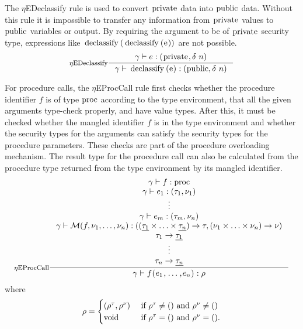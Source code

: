 \documentclass[a4paper, 10pt, draft]{report}
\newcommand{\mycode}[1]{\ensuremath{\mbox{\lstinline{#1}}}}
\begin{document}
The $\eta$EDeclassify rule is used to convert \mycode{private} data into
\mycode{public} data. Without this rule it is impossible to transfer any
information from \mycode{private} values to \mycode{public} variables or
output. By requiring the argument to be of \mycode{private} security type,
expressions like \mycode{declassify(declassify(e))} are not possible.
\[
\inference[$\eta$EDeclassify]{\gamma |- e : (\mycode{private}, \delta\ n)}{\gamma |- \mycode{declassify(e)} : (\mycode{public}, \delta\ n)}
\]

For procedure calls, the $\eta$EProcCall rule first checks whether the
procedure identifier $f$ is of type \mycode{proc} according to the type
environment, that all the given arguments type-check properly, and have value
types. After this, it must be checked whether the mangled identifier $f$ is in
the type environment and whether the security types for the arguments can
satisfy the security types for the procedure parameters. These checks are part
of the procedure overloading mechanism. The result type for the procedure call
can also be calculated from the procedure type returned from the type
environment by its mangled identifier.
\[ \inference[$\eta$EProcCall]{
  \gamma |- f : \mycode{proc}\\
  \gamma |- e_1 : (\tau_1, \nu_1) \\
  \vdots \\
  \gamma |- e_m : (\tau_m, \nu_n) \\
  \gamma |- \mathcal{M}(f, \nu_1, \ldots, \nu_n)
    : ((\underline{\tau_1}\times\ldots\times\underline{\tau_n}) \to \tau,
       (\nu_1 \times \ldots \times \nu_n) \to \nu) \\
  \tau_1 \to \underline{\tau_1} \\
  \vdots \\
  \tau_n \to \underline{\tau_n} \\
}{\gamma |- f\mycode{(}e_1\mycode{,}\ldots\mycode{,}e_n\mycode{)} : \rho}
\] where \[
\rho = \begin{cases}
  (\rho^\tau, \rho^\nu) & \text{ if } \rho^\tau \neq () \text{ and } \rho^\nu \neq () \\
  \mycode{void}         & \text{ if } \rho^\tau   =  () \text{ and } \rho^\nu   =  ().
\end{cases}
\]
\end{document}
